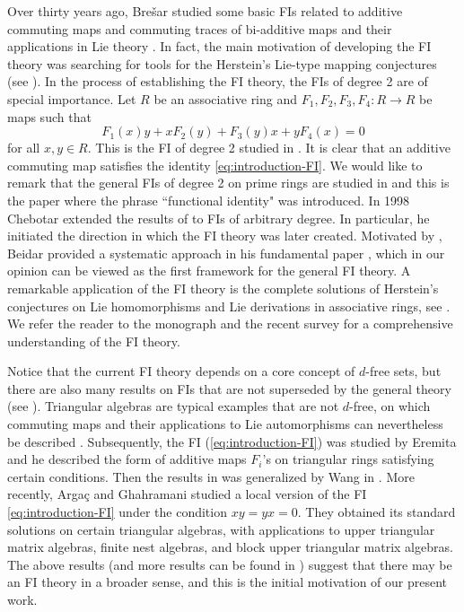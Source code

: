 \documentclass[reqno]{amsart}
\numberwithin{equation}{section}
\theoremstyle{plain}
\theoremstyle{definition}
\begin{document}
Over thirty years ago, Bre\v{s}ar studied some basic FIs related to additive commuting maps
and commuting traces of bi-additive maps and their applications in Lie theory \cite{Bre93-1,Bre93-2}.
In fact, the main motivation of developing the FI theory was searching for tools for the
Herstein's Lie-type mapping conjectures (see \cite{Her}). In the process of establishing the FI theory,
the FIs of degree 2 are of special importance. Let $R$ be an associative ring
and $F_1, F_2, F_3, F_4: R\rightarrow R$ be maps such that
\begin{equation}\label{eq:introduction-FI}
F_1(x)y+xF_2(y)+F_3(y)x+yF_4(x)=0
\end{equation}
for all $x,y\in R$. This is the FI of degree 2 studied in \cite{Bre95-2}.
It is clear that an additive commuting map satisfies the identity \eqref{eq:introduction-FI}.
We would like to remark that the general FIs of degree 2 on
prime rings are studied in \cite{Bre95-1} and this is the paper where the phrase ``functional identity" was introduced.
In 1998 Chebotar \cite{Che98} extended the results of \cite{Bre95-1} to FIs of arbitrary degree. In particular, he initiated
the direction in which the FI theory was later created. Motivated by \cite{Che98}, Beidar provided a systematic
approach in his fundamental paper \cite{Beidar98}, which in our opinion can be viewed as the first framework for the general FI theory.
A remarkable application of the FI theory is the complete solutions of Herstein's conjectures on
Lie homomorphisms and Lie derivations in associative rings, see \cite{BBCM1,BBCM2,BBCM3}.
We refer the reader to the monograph \cite{BCM07} and the recent survey \cite{Bre23} for a comprehensive
understanding of the FI theory.

Notice that the current FI theory depends on a core concept of $d$-free sets, but
there are also many results on FIs that are not superseded by the general theory (see \cite{BCM07}).
Triangular algebras are typical examples that are not $d$-free, on which commuting maps
and their applications to Lie automorphisms can nevertheless be described \cite{BE04,Cheung}.
Subsequently, the FI (\ref{eq:introduction-FI}) was studied by Eremita \cite{Eremita13}
and he described the form of additive maps $F_i$'s on triangular rings satisfying certain conditions.
Then the results in \cite{Eremita13} was generalized by Wang in \cite{Wang15}.
More recently, Arga\c{c} and Ghahramani \cite{ArgacGhahramani25} studied a local version of the FI
\eqref{eq:introduction-FI} under the condition $xy=yx=0$. They
obtained its standard solutions on certain triangular algebras,
with applications to upper triangular matrix algebras, finite nest
algebras, and block upper triangular matrix algebras.
The above results (and more results can be found in \cite{BCM07,Bre23}) suggest that
there may be an FI theory in a broader sense, and this is the initial motivation of our present work.
\end{document}
